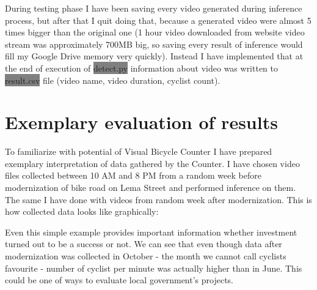 During testing phase I have been saving every video generated during inference process, but after that I quit doing that, because a generated video were almost 5 times bigger than the original one (1 hour video downloaded from website video stream was approximately 700MB big, so saving every result of inference would fill my Google Drive memory very quickly). Instead I have implemented that at the end of execution of \colorbox{Gray}{detect.py} information about video was written to \colorbox{Gray}{result.csv} file (video name, video duration, cyclist count).
\section{Exemplary evaluation of results}
\label{sec:results}
To familiarize with potential of Visual Bicycle Counter I have prepared exemplary interpretation of data gathered by the Counter. I have chosen video files collected between 10 AM and 8 PM from a random week before modernization of bike road on Lema Street and performed inference on them. The same I have done with videos from random week after modernization. This is how collected data looks like graphically:
\begin{figure} [h]
    \centering
    \label{fig:graph}
\end{figure}
Even this simple example provides important information whether investment turned out to be a success or not. We can see that even though data after modernization was collected in October - the month we cannot call cyclists favourite - number of cyclist per minute was actually higher than in June. This could be one of ways to evaluate local government's projects.